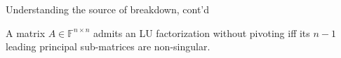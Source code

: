 \documentclass[t,usepdftitle=false]{beamer}
\begin{document}
\begin{frame}{Understanding the source of breakdown, cont'd}
\begin{theorem}
A matrix $A\in\mathbb{F}^{n\times n}$ admits an LU factorization without pivoting iff its $n-1$ leading principal sub-matrices are non-singular.
\end{theorem}
\end{frame}
\end{document}
